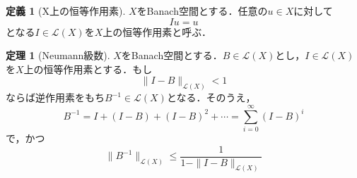 \documentclass[11pt,a4paper,titlepage]{jsreport}
\theoremstyle{definition}
\newtheorem{dfn}{定義}
\newtheorem{thm}{定理}
\begin{document}
\begin{dfn}[X上の恒等作用素]
  $X$をBanach空間とする．任意の$u\in X$に対して
  \begin{equation*}
    Iu=u
  \end{equation*}
  となる$I\in\mathcal{L}(X)$を$X$上の恒等作用素と呼ぶ．
\end{dfn}

\begin{thm}[Neumann級数]
  \label{thm:Neumann級数}
  $X$をBanach空間とする．$B\in\mathcal{L}(X)$とし，$I\in\mathcal{L}(X)$を$X$上の恒等作用素とする．もし
  \begin{equation*}
    \|I-B\|_{\mathcal{L}(X)}<1
  \end{equation*}
  ならば逆作用素をもち$B^{-1}\in\mathcal{L}(X)$となる．そのうえ，
  \begin{equation*}
    B^{-1} = I + (I-B) + (I-B)^2 + \cdots = \sum^\infty_{i=0}(I-B)^i
  \end{equation*}
  で，かつ
  \begin{equation*}
    \|B^{-1}\|_{\mathcal{L}(X)} \leq \frac{1}{1-\|I-B\|_{\mathcal{L}(X)}}
  \end{equation*}
\end{thm}
\end{document}
